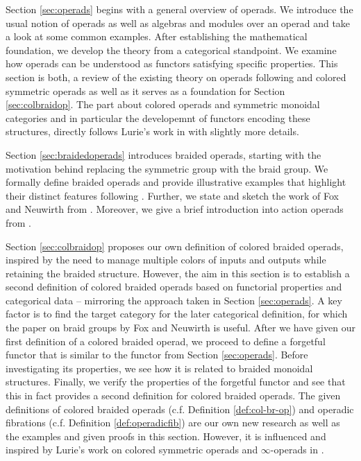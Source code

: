 \medskip

Section \ref{sec:operads} begins with a general overview of operads. We
introduce the usual notion of operads as well as algebras and modules over an
operad and take a look at some common examples. After establishing the
mathematical foundation, we develop the theory from a categorical standpoint. We
examine how operads can be understood as functors satisfying specific
properties. This section is both, a review of the existing theory on
operads following \cite{may} and colored symmetric operads \cite{ha} as well as it
serves as a foundation for Section \ref{sec:colbraidop}. The part about colored
operads and symmetric monoidal categories and in particular the developemnt of
functors encoding these structures, directly follows Lurie's work in \cite[Section 2.1]{ha} with slightly more
details.


\medskip
Section \ref{sec:braidedoperads} introduces braided operads, starting with the
motivation behind replacing the symmetric group with the braid group. We
formally define braided operads and provide illustrative examples that highlight
their distinct features following \cite[Section 4,5]{yau}. Further, we state and sketch the work of Fox and
Neuwirth from \cite{fox}. Moreover, we give a brief introduction into action
operads from \cite{yau}.


\medskip
Section \ref{sec:colbraidop} proposes our own definition of colored braided
operads, inspired by the need to manage multiple colors of inputs and outputs
while retaining the braided structure. However, the aim in this section is to
establish a second definition of colored braided operads based on functorial
properties and categorical data -- mirroring the approach taken in Section
\ref{sec:operads}. A key factor is to find the target category for the later
categorical definition, for which the paper on braid groups by Fox and Neuwirth
\cite{fox} is useful. After we have given our first definition of a colored
braided operad, we proceed to define a forgetful functor that is similar to the
functor from Section \ref{sec:operads}. Before investigating its
properties, we see how it is related to braided monoidal structures. Finally, we
verify the properties of the forgetful functor and see that this in fact provides a
second definition for colored braided operads. The given definitions of colored
braided operads (c.f. Definition \ref{def:col-br-op}) and operadic fibrations
(c.f. Definition \ref{def:operadicfib}) are our own new research as well as the examples and
given proofs in this section. However, it is influenced and inspired by Lurie's
work on colored symmetric operads and $\infty$-operads in \cite{ha}.

